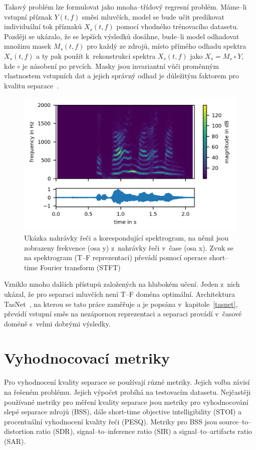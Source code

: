Takový problém lze formulovat jako mnoha--třídový regresní problém. Máme--li vstupní příznak $Y(t,f)$ směsi mluvčích, model se bude učit predikovat individuální tok příznaků $X_s(t,f)$ pomocí vhodného trénovacího datasetu. Později se ukázalo, že se lepších výsledků dosáhne, bude--li model odhadovat množinu masek $M_s(t,f)$ pro každý ze zdrojů, místo přímého odhadu spektra $X_s(t,f)$ a ty pak použít k~rekonstrukci spektra $X_s(t,f)$ jako $X_s = M_s \circ Y$, kde $\circ$ je násobení po prvcích. Masky jsou invariantní vůči proměnným vlastnostem vstupních dat a jejich správný odhad je důležitým faktorem pro kvalitu separace~\cite{cocktailparty}.


\begin{figure}[H]
    \centering
    \includegraphics[scale=1.15]{obrazky-figures/spektrum.png}
    \caption{\label{fig:spektrum}Ukázka nahrávky řeči a korespondující spektrogram, na němž jsou zobrazeny frekvence (osa y) z~nahrávky řeči v~čase (osa x). Zvuk se na spektrogram (T--F reprezentaci) převádí pomocí operace short--time Fourier transform (STFT)}
\end{figure}


Vzniklo mnoho dalších přístupů založených na hlubokém učení. Jeden z~nich ukázal, že pro separaci mluvčích není T--F doména optimální. Architektura TasNet~\cite{luo2018convtasnet}, na kterou se tato práce zaměřuje a je popsána v~kapitole~\ref{tasnet}, převádí vstupní směs na nezápornou reprezentaci a separaci provádí v~časové doméně s~velmi dobrými výsledky.



\section{Vyhodnocovací metriky}
Pro vyhodnocení kvality separace se používají různé metriky. Jejich volba závisí na řešeném problému. Jejich výpočet probíhá na testovacím datasetu. Nejčastěji používané metriky pro měření kvality separace jsou metriky pro vyhodnocování slepé separace zdrojů (BSS), dále short-time objective intelligibility (STOI) a procentuální vyhodnocení kvality řeči (PESQ). Metriky pro BSS jsou source--to--distortion ratio (SDR), signal--to--inference ratio (SIR) a signal--to--artifacts ratio (SAR).


